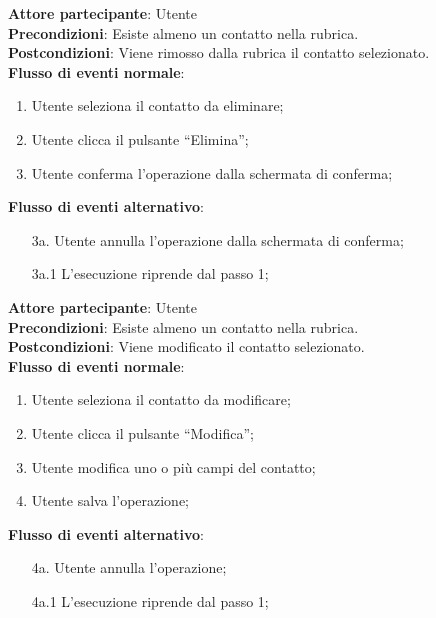 \begin{tcolorbox}[colback=white,colframe=black!80!white,title=\textbf{C2 - Eliminare contatto}]
	\textbf{Attore partecipante}: Utente
	\\\textbf{Precondizioni}: Esiste almeno un contatto nella rubrica.
	\\\textbf{Postcondizioni}: Viene rimosso dalla rubrica il contatto selezionato.
	\\\textbf{Flusso di eventi normale}:
	\begin{enumerate}[noitemsep, topsep=0pt]
\item	Utente seleziona il contatto da eliminare;
\item	Utente clicca il pulsante “Elimina”;
\item	Utente conferma l’operazione dalla schermata di conferma;
	\end{enumerate}
	\textbf{Flusso di eventi alternativo}:
	\begin{itemize}[noitemsep, topsep=0pt]
		\item[3a. ] Utente annulla l’operazione dalla schermata di conferma;
		\item[3a.1] L’esecuzione riprende dal passo 1;
	\end{itemize}
\end{tcolorbox}

\begin{tcolorbox}[colback=white,colframe=black!80!white,title=\textbf{C3 - Modificare contatto}]
	\textbf{Attore partecipante}: Utente
	\\\textbf{Precondizioni}: Esiste almeno un contatto nella rubrica.
	\\\textbf{Postcondizioni}: Viene modificato il contatto selezionato.
	\\\textbf{Flusso di eventi normale}:
	\begin{enumerate}[noitemsep, topsep=0pt]
\item Utente seleziona il contatto da modificare;
\item Utente clicca il pulsante “Modifica”; 
\item Utente modifica uno o più campi del contatto;
\item Utente salva l’operazione;	
	\end{enumerate}
	\textbf{Flusso di eventi alternativo}:
	\begin{itemize}[noitemsep, topsep=0pt]
		\item[4a. ] Utente annulla l’operazione;
		\item[4a.1] L’esecuzione riprende dal passo 1;
	\end{itemize}
\end{tcolorbox}

